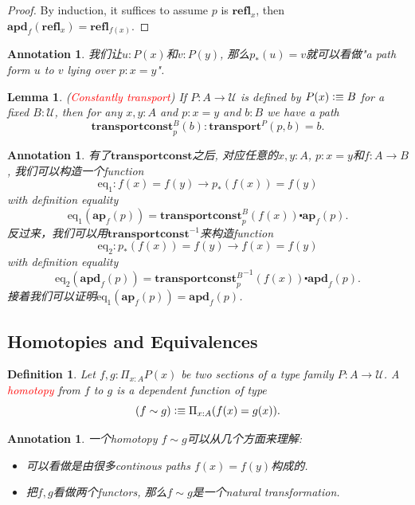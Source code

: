 \documentclass{article}
\newtheorem{lemma}[theorem]{Lemma}
\newtheorem{definition}[theorem]{Definition}
\newtheorem{annotation}[theorem]{Annotation}
\newcommand{\redt}[1]{\textcolor{red}{#1}}
\newcommand{\defeqv}{\vcentcolon\equiv}
\newcommand{\refl}{\textbf{refl}}
\newcommand{\ap}{\textbf{ap}}
\newcommand{\apd}{\textbf{apd}}
\newcommand{\transport}{\textbf{transport}}
\newcommand{\transportconst}{\textbf{transportconst}}
\begin{document}
\begin{proof}
\rm By induction, it suffices to assume $p$ is $\refl_x$, then $\apd_f(\refl_x) = \refl_{f(x)}$. 
\end{proof}

\begin{annotation}
\rm 我们让$u : P(x)$和$v : P(y)$, 那么$p_*(u) = v $就可以看做"a path form $u$ to $v$ lying over $p : x=y$". 
\end{annotation}

\begin{lemma}
\rm (\redt{Constantly transport}) If $P : A \to \mathcal{U}$ is defined by $P(x) \defeqv B$ for a fixed $B : \mathcal{U}$, then for any $x, y : A$ and $p : x=y$ and $b : B$ we have a path
\[
    \transportconst_p^B(b) : \transport^P(p, b) = b.
\]
\end{lemma}

\begin{annotation}
\rm 有了$\transportconst$之后, 对应任意的$x,y : A$, $p : x = y$和$f : A \to B$, 我们可以构造一个function
\[
    \text{eq}_1 : f(x) = f(y) \to p_*(f(x)) = f(y)
\]
with definition equality
\[
    \text{eq}_1(\ap_f(p)) = \transportconst_p^B(f(x)) \centerdot \ap_f(p). 
\]
反过来，我们可以用$\transportconst^{-1}$来构造function
\[
    \text{eq}_2 : p_*(f(x)) = f(y) \to f(x) = f(y)
\]
with definition equality
\[
    \text{eq}_2(\apd_f(p)) =  {\transportconst_p^B}^{-1}(f(x)) \centerdot \apd_f(p). 
\]
接着我们可以证明$\text{eq}_1(\ap_f(p)) = \apd_f(p)$.
\end{annotation}

\newpage
\subsection{Homotopies and Equivalences}

\begin{definition}
\rm Let $f, g : \Pi_{x : A} P(x)$ be two sections of a type family $P: A \to \mathcal{U}$. A \redt{homotopy} from $f$ to $g$ is a dependent function of type
\[
    (f \sim g) \defeqv \Pi_{x : A} (f(x) = g(x)).
\]
\end{definition}

\begin{annotation}
\rm 一个homotopy $f \sim g$可以从几个方面来理解:
\begin{itemize}
    \item 可以看做是由很多continous paths $f(x) = f(y)$构成的.
    \item 把$f,g$看做两个functors, 那么$f \sim g$是一个natural transformation.
\end{itemize}
\end{annotation}
\end{document}
